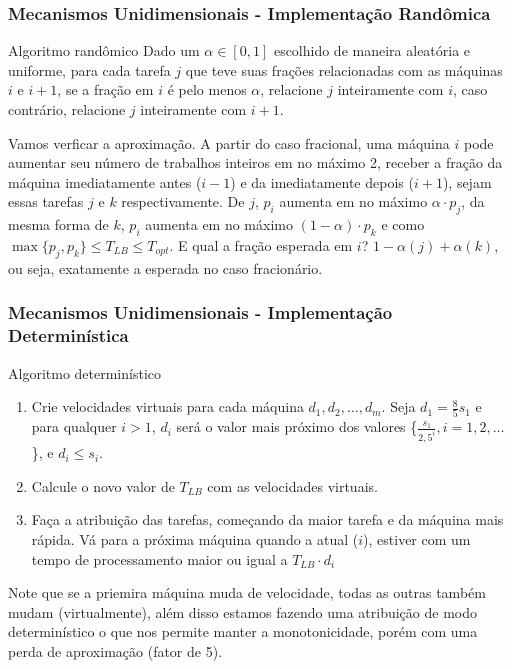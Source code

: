 \documentclass{beamer}
\begin{document}
\begin{frame}
    \frametitle{Mecanismos Unidimensionais - Implementação Randômica}
    \begin{block}{Algoritmo randômico}
        Dado um $\alpha \in [0, 1]$ escolhido de maneira aleatória e uniforme, para cada tarefa $j$ que teve suas frações relacionadas com as máquinas $i$ e $i + 1$, se a fração em $i$ é pelo menos $\alpha$, relacione $j$ inteiramente com $i$, caso contrário, relacione $j$ inteiramente com $i + 1$.
    \end{block}
    Vamos verficar a aproximação. A partir do caso fracional, uma máquina $i$ pode aumentar seu número de trabalhos inteiros em no máximo 2, receber a fração da máquina imediatamente antes ($i - 1$) e da imediatamente depois ($i + 1$), sejam essas tarefas $j$ e $k$ respectivamente. De $j$, $p_i$ aumenta em no máximo $\alpha \cdot p_j$, da mesma forma de $k$, $p_i$ aumenta em no máximo $(1 - \alpha) \cdot p_k$ e como $\max\{p_j, p_k\} \leq T_{LB} \leq T_{opt}$. E qual a fração esperada em $i$? $1 - \alpha (j) + \alpha (k)$, ou seja, exatamente a esperada no caso fracionário.
\end{frame}

\begin{frame}
    \frametitle{Mecanismos Unidimensionais - Implementação Determinística}
    \begin{block}{Algoritmo determinístico}
        \begin{enumerate}
            \item{Crie velocidades virtuais para cada máquina $d_1, d_2, \ldots, d_m$. Seja $d_1 = \frac{8}{5}s_1$ e para qualquer $i > 1$, $d_i$ será o valor mais próximo dos valores \{$\frac{s_1}{2,5^i}, i = 1, 2, \ldots $\}, e $d_i \leq s_i$.}
            \item{Calcule o novo valor de $T_{LB}$ com as velocidades virtuais.}
            \item{Faça a atribuição das tarefas, começando da maior tarefa e da máquina mais rápida. Vá para a próxima máquina quando a atual ($i$), estiver com um tempo de processamento maior ou igual a $T_{LB} \cdot d_i$}
        \end{enumerate}
    \end{block}
    Note que se a priemira máquina muda de velocidade, todas as outras também mudam (virtualmente), além disso estamos fazendo uma atribuição de modo determinístico o que nos permite manter a monotonicidade, porém com uma perda de aproximação (fator de 5).
\end{frame}
\end{document}
